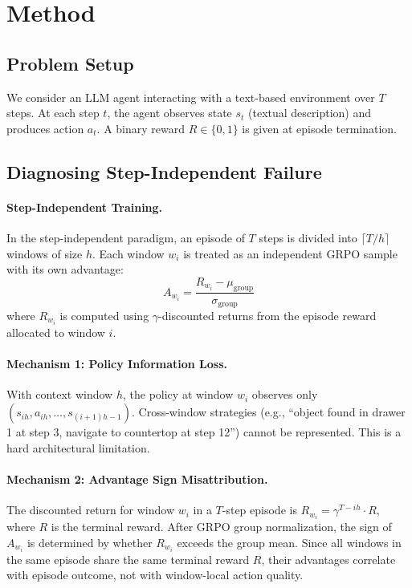 \documentclass[11pt]{article}
\begin{document}
\section{Method}

\subsection{Problem Setup}

We consider an LLM agent interacting with a text-based environment over $T$ steps. At each step $t$, the agent observes state $s_t$ (textual description) and produces action $a_t$. A binary reward $R \in \{0, 1\}$ is given at episode termination.

\subsection{Diagnosing Step-Independent Failure}

\paragraph{Step-Independent Training.}
In the step-independent paradigm, an episode of $T$ steps is divided into $\lceil T/h \rceil$ windows of size $h$. Each window $w_i$ is treated as an independent GRPO sample with its own advantage:
\begin{equation}
A_{w_i} = \frac{R_{w_i} - \mu_{\text{group}}}{\sigma_{\text{group}}}
\end{equation}
where $R_{w_i}$ is computed using $\gamma$-discounted returns from the episode reward allocated to window $i$.

\paragraph{Mechanism 1: Policy Information Loss.}
With context window $h$, the policy at window $w_i$ observes only $(s_{ih}, a_{ih}, \ldots, s_{(i+1)h-1})$. Cross-window strategies (e.g., ``object found in drawer 1 at step 3, navigate to countertop at step 12'') cannot be represented. This is a hard architectural limitation.

\paragraph{Mechanism 2: Advantage Sign Misattribution.}
The discounted return for window $w_i$ in a $T$-step episode is $R_{w_i} = \gamma^{T - ih} \cdot R$, where $R$ is the terminal reward. After GRPO group normalization, the sign of $A_{w_i}$ is determined by whether $R_{w_i}$ exceeds the group mean. Since all windows in the same episode share the same terminal reward $R$, their advantages correlate with episode outcome, not with window-local action quality.
\end{document}
